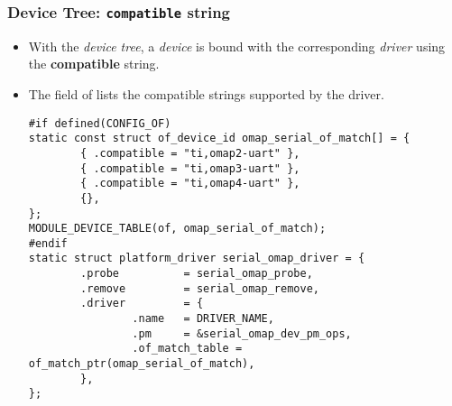 \begin{frame}[fragile]
  \frametitle{Device Tree: {\tt compatible} string}
  \begin{itemize}
  \item With the {\em device tree}, a {\em device} is bound with the
    corresponding {\em driver} using the {\bf compatible} string.
  \item The  field of 
    lists the compatible strings supported by the driver.
  \begin{verbatim}
#if defined(CONFIG_OF)
static const struct of_device_id omap_serial_of_match[] = {
        { .compatible = "ti,omap2-uart" },
        { .compatible = "ti,omap3-uart" },
        { .compatible = "ti,omap4-uart" },
        {},
};
MODULE_DEVICE_TABLE(of, omap_serial_of_match);
#endif
static struct platform_driver serial_omap_driver = {
        .probe          = serial_omap_probe,
        .remove         = serial_omap_remove,
        .driver         = {
                .name   = DRIVER_NAME,
                .pm     = &serial_omap_dev_pm_ops,
                .of_match_table = of_match_ptr(omap_serial_of_match),
        },
};
\end{verbatim}
  \end{itemize}
\end{frame}

